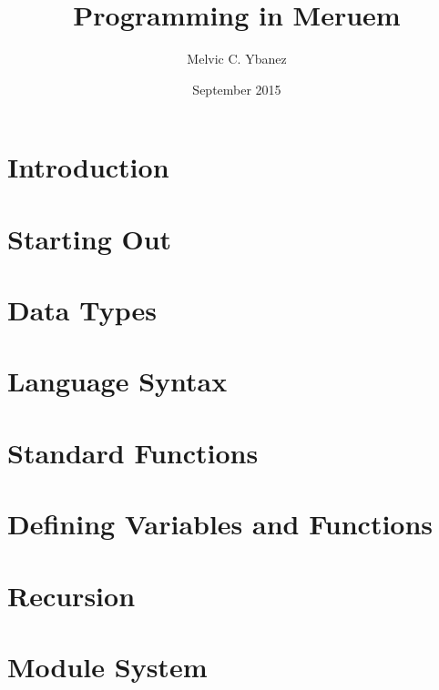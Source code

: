 \documentclass[12pt, twoside, obeyspaces]{report}
\title{Programming in Meruem}
\author{Melvic C. Ybanez}
\date{September 2015}
\begin{document}
	\maketitle
	
	\tableofcontents
	
	\chapter*{Introduction}
		
	
	\chapter{Starting Out}
	
	
	\chapter{Data Types}
	
	
	\chapter{Language Syntax}
	
	
	\chapter{Standard Functions}
	
	
	\chapter{Defining Variables and Functions}
	
	
	\chapter{Recursion}
	
	
	\chapter{Module System}
	
\end{document}
